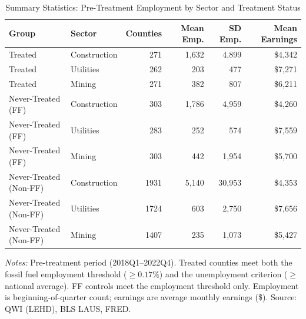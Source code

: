 \begin{table}[htbp]
\centering
\begin{threeparttable}
\caption{Summary Statistics: Pre-Treatment Employment by Sector and Treatment Status}
\label{tab:summary}
\small
\begin{tabular}{llrrrr}
\toprule
Group & Sector & Counties & Mean Emp. & SD Emp. & Mean Earnings \\
\midrule
Treated & Construction & 271 & 1,632 & 4,899 & \$4,342 \\
Treated & Utilities & 262 & 203 & 477 & \$7,271 \\
Treated & Mining & 271 & 382 & 807 & \$6,211 \\
\addlinespace
Never-Treated (FF) & Construction & 303 & 1,786 & 4,959 & \$4,260 \\
Never-Treated (FF) & Utilities & 283 & 252 & 574 & \$7,559 \\
Never-Treated (FF) & Mining & 303 & 442 & 1,954 & \$5,700 \\
\addlinespace
Never-Treated (Non-FF) & Construction & 1931 & 5,140 & 30,953 & \$4,353 \\
Never-Treated (Non-FF) & Utilities & 1724 & 603 & 2,750 & \$7,656 \\
Never-Treated (Non-FF) & Mining & 1407 & 235 & 1,073 & \$5,427 \\
\bottomrule
\end{tabular}
\begin{tablenotes}[flushleft]\scriptsize
\item \textit{Notes:} Pre-treatment period (2018Q1--2022Q4). Treated counties meet both the fossil fuel employment threshold ($\geq 0.17\%$) and the unemployment criterion ($\geq$ national average). FF controls meet the employment threshold only. Employment is beginning-of-quarter count; earnings are average monthly earnings (\$). Source: QWI (LEHD), BLS LAUS, FRED.
\end{tablenotes}
\end{threeparttable}
\end{table}
